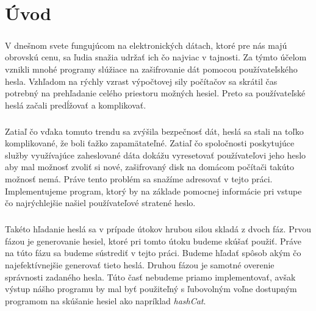 \chapter*{Úvod}
\paragraph{}
V dnešnom svete fungujúcom na elektronických dátach, ktoré pre nás majú obrovskú cenu, sa ľudia snažia udržať ich čo najviac v tajnosti. Za týmto účelom vznikli mnohé programy slúžiace na zašifrovanie dát pomocou používateľského hesla. Vzhľadom na rýchly vzrast výpočtovej sily počítačov sa skrátil čas potrebný na prehľadanie celého priestoru možných hesiel. Preto sa používateľské heslá začali predĺžovať a komplikovať.

\paragraph{}
Zatiaľ čo vďaka tomuto trendu sa zvýšila bezpečnosť dát, heslá sa stali na toľko komplikované, že boli ťažko zapamätateľné. Zatiaľ čo spoločnosti poskytujúce služby využívajúce zaheslované dáta dokážu vyresetovať používateľovi jeho heslo aby mal možnosť zvoliť si nové, zašifrovaný disk na domácom počítači takúto možnosť nemá. Práve tento problém sa snažíme adresovať v tejto práci. Implementujeme program, ktorý by na základe pomocnej informácie pri vstupe čo najrýchlejšie našiel používateľové stratené heslo.

\paragraph{}
Takéto hľadanie heslá sa v prípade útokov hrubou silou skladá z dvoch fáz. Prvou fázou je generovanie hesiel, ktoré pri tomto útoku budeme skúšať použiť. Práve na túto fázu sa budeme sústrediť v tejto práci. Budeme hľadať spôsob akým čo najefektívnejšie generovať tieto heslá. Druhou fázou je samotné overenie správnosti zadaného hesla. Túto časť nebudeme priamo implementovať, avšak výstup nášho programu by mal byť použiteľný s ľubovolným voľne dostupným programom na skúšanie hesiel ako napríklad \emph{hashCat}.